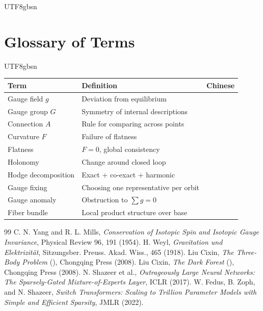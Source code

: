 \documentclass[11pt,a4paper]{article}
\begin{document}
\begin{CJK}{UTF8}{gbsn}
{\section{Glossary of Terms}
\begin{CJK}{UTF8}{gbsn}
\begin{center}
\begin{tabular}{l|l|l}
    \toprule
    \textbf{Term} & \textbf{Definition} & \textbf{Chinese} \\
    \midrule
    Gauge field $g$ & Deviation from equilibrium &  \\
    Gauge group $G$ & Symmetry of internal descriptions &  \\
    Connection $A$ & Rule for comparing across points &  \\
    Curvature $F$ & Failure of flatness &  \\
    Flatness & $F=0$, global consistency &  \\
    Holonomy & Change around closed loop &  \\
    Hodge decomposition & Exact + co-exact + harmonic &  \\
    Gauge fixing & Choosing one representative per orbit &  \\
    Gauge anomaly & Obstruction to $\sum g = 0$ &  \\
    Fiber bundle & Local product structure over base &  \\
    \bottomrule
\end{tabular}
\end{center}
\end{CJK}
\begin{thebibliography}{99}
C. N. Yang and R. L. Mills, \textit{Conservation of Isotopic Spin and Isotopic Gauge Invariance}, Physical Review 96, 191 (1954).
H. Weyl, \textit{Gravitation und Elektrizität}, Sitzungsber. Preuss. Akad. Wiss., 465 (1918).
Liu Cixin, \textit{The Three-Body Problem} (), Chongqing Press (2008).
Liu Cixin, \textit{The Dark Forest} (), Chongqing Press (2008).
N. Shazeer et al., \textit{Outrageously Large Neural Networks: The Sparsely-Gated Mixture-of-Experts Layer}, ICLR (2017).
W. Fedus, B. Zoph, and N. Shazeer, \textit{Switch Transformers: Scaling to Trillion Parameter Models with Simple and Efficient Sparsity}, JMLR (2022).

\end{thebibliography}}
\end{CJK}
\end{document}
